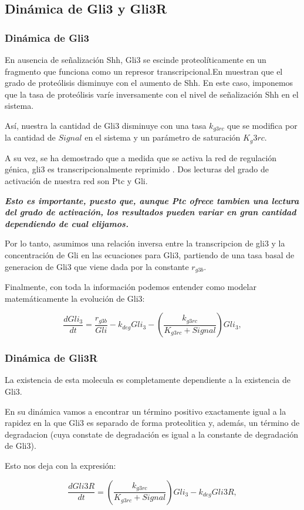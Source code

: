  \subsection{Dinámica de Gli3 y Gli3R}
 \subsubsection{Dinámica de Gli3}
 En ausencia de señalización Shh, Gli3 se escinde proteolíticamente en un fragmento que funciona como un
 represor transcripcional.En \cite{wang2000hedgehog} muestran que el grado de proteólisis disminuye con el aumento de Shh. En este caso, imponemos que la tasa de proteólisis varíe inversamente con el nivel de señalización Shh en el sistema.
 
 Así, nuestra la cantidad de Gli3 disminuye con una tasa $k_{g3rc}$ que se modifica por la cantidad de $Signal$ en el sistema y un parámetro de saturación $K_g3rc$.
 
 A su vez, se ha demostrado que a medida que se activa la red de regulación génica, gli3 es transcripcionalmente
 reprimido \cite{wang2000hedgehog}. Dos lecturas del grado de activación de nuestra red son Ptc y Gli. 
 
 \textbf{\textit{Esto es importante, puesto que, aunque Ptc ofrece tambien una lectura del grado de activación, los resultados pueden variar en gran cantidad dependiendo de cual elijamos.}}
 
 Por lo tanto, asumimos una relación inversa entre la transcripcion de gli3 y la concentración de Gli en las ecuaciones para Gli3, partiendo de una tasa basal de generacion de Gli3 que viene dada por la constante $r_{g3b}$. 
 
 Finalmente, con toda la información podemos entender como modelar matemáticamente la evolución de Gli3:
 
  \begin{equation}
  \frac{dGli_3}{dt} = \frac{r_{g3b}}{Gli}-k_{deg}Gli_3-\left(\frac{k_{g3rc}}{K_{g3rc}+Signal}\right)Gli_3,
  \end{equation}
 
 \subsubsection{Dinámica de Gli3R}
 La existencia de esta molecula es completamente dependiente a la existencia de Gli3.
 
 En su dinámica vamos a encontrar un término positivo exactamente igual a la rapidez en la que Gli3 es separado de forma proteolitica y, además, un término de degradacion (cuya constate de degradación es igual a la constante de degradación de Gli3).
 
  Esto nos deja con la expresión:

 
 \begin{equation}
 \frac{dGli3R}{dt}= \left(\frac{k_{g3rc}}{K_{g3rc}+Signal}\right)Gli_3-k_{deg}Gli3R,
 \end{equation}
 
 
 